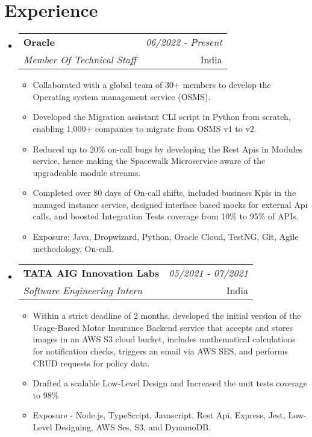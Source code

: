 \documentclass[a4paper,12pt]{article}
\makeatletter
\newcommand{\resumeSubheading}[4]{
\vspace{0.5mm}\item[]
    \begin{tabular*}{0.98\textwidth}[t]{l@{\extracolsep{\fill}}r}
        \textbf{#1} & \textit{\footnotesize{#4}} \\
        \textit{\footnotesize{#3}} &  \footnotesize{#2}\\
    \end{tabular*}
    \vspace{-1.0mm}
}
\newcommand{\resumeSubHeadingListStart}{\begin{itemize}[leftmargin=*,labelsep=0mm]}
\newcommand{\resumeItemListStart}{\begin{justify}\begin{itemize}[leftmargin=3ex, rightmargin=2ex, noitemsep,labelsep=1.2mm,itemsep=0.8mm]\small}
\newcommand{\resumeSubHeadingListEnd}{\end{itemize}\vspace{2mm}}
\newcommand{\resumeItemListEnd}{\end{itemize}\end{justify}\vspace{-2mm}}
\makeatother
\begin{document}
\section{\textbf{Experience}}
  \resumeSubHeadingListStart
    \resumeSubheading
      {Oracle}{India}
      {Member Of Technical Staff}{06/2022 - Present}
      \vspace{-2.0mm}
      \resumeItemListStart
    \item {Collaborated with a global team of 30+ members to develop the Operating system management service (OSMS).}
    \item {Developed the Migration assistant CLI script in Python from scratch, enabling 1,000+ companies to migrate from OSMS v1 to v2.}
    \item {Reduced up to 20\% on-call bugs by developing the Rest Apis in Modules service, hence making the Spacewalk Microservice aware of the upgradeable module streams.}
    \item {Completed over 80 days of On-call shifts, included business Kpis in the managed instance service, designed interface based mocks for external Api calls, and boosted Integration Tests coverage from 10\% to 95\% of APIs.}
    \item {Exposure: Java, Dropwizard, Python, Oracle Cloud, TestNG, Git, Agile methodology, On-call.}
    \resumeItemListEnd
    
    \vspace{-0.5mm}
    
    \resumeSubheading
      {TATA AIG Innovation Labs}{India}
      {Software Engineering Intern}{05/2021 - 07/2021}
      \vspace{-2.0mm}
      \resumeItemListStart
    \item {Within a strict deadline of 2 months, developed the initial version of the Usage-Based Motor Insurance Backend service that accepts and stores images in an AWS S3 cloud bucket, includes mathematical calculations for notification checks, triggers an email via AWS SES, and performs CRUD requests for policy data.}
    \item {Drafted a scalable Low-Level Design and Increased the unit tests coverage to 98\%}
    \item {Exposure - Node.js, TypeScript, Javascript, Rest Api, Express, Jest, Low-Level Designing, AWS Ses, S3, and DynamoDB.}
    \resumeItemListEnd
      
  \resumeSubHeadingListEnd
\vspace{-6mm}
\end{document}
